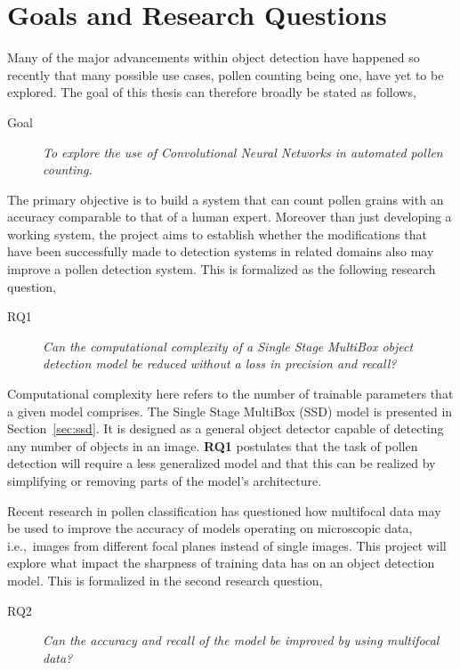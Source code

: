 \section{Goals and Research Questions}\label{sec:Goals and Research Questions}
Many of the major advancements within object detection have happened so recently that many possible use cases, pollen counting being one, have yet to be explored.
The goal of this thesis can therefore broadly be stated as follows,

\begin{description}
\item[Goal] \textit{To explore the use of Convolutional Neural Networks in automated pollen counting.}
\end{description}

The primary objective is to build a system that can count pollen grains with an accuracy comparable to that of a human expert.
Moreover than just developing a working system, the project aims to establish whether the modifications that have been successfully made to detection systems in related domains also may improve a pollen detection system.
This is formalized as the following research question,

\begin{description}
\item[RQ1] \textit{Can the computational complexity of a Single Stage MultiBox object detection model be reduced without a loss in precision and recall?}
\end{description}

Computational complexity here refers to the number of trainable parameters that a given model comprises.
The Single Stage MultiBox (SSD) model is presented in Section~\ref{sec:ssd}.
It is designed as a general object detector capable of detecting any number of objects in an image.
\textbf{RQ1} postulates that the task of pollen detection will require a less generalized model and that this can be realized by simplifying or removing parts of the model's architecture.

Recent research in pollen classification has questioned how multifocal data may be used to improve the accuracy of models operating on microscopic data, i.e.,\ images from different focal planes instead of single images.
This project will explore what impact the sharpness of training data has on an object detection model.
This is formalized in the second research question,

\begin{description}
    \item[RQ2] \textit{Can the accuracy and recall of the model be improved by using multifocal data?}
\end{description}

